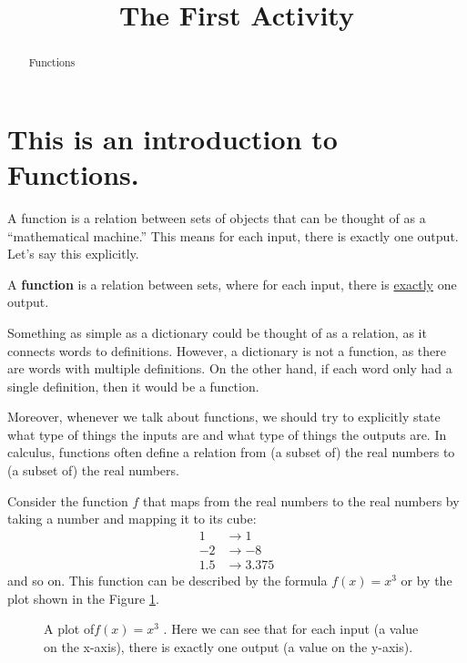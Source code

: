 \documentclass{ximera}
\title{The First Activity}
\theoremstyle{definition}
\begin{document}
  
\begin{abstract}  
Functions  
\end{abstract}  
\maketitle  
\section*{This is an introduction to Functions.}  
A function is a relation between sets of objects that can be thought of as a ``mathematical machine.'' This means for each input, there is exactly one output. Let’s say this explicitly.
\begin{definition}
	A \textbf{function} is a relation between sets, where for each input, there is \underline{exactly} one output.
\end{definition}
\begin{remark}
	Something as simple as a dictionary could be thought
	of as a relation, as it connects words to definitions.
	However, a dictionary is not a function, as there
	are words with multiple definitions. On the other
	hand, if each word only had a single definition, then
	it would be a function.
\end{remark}
Moreover, whenever we talk about functions, we should try to explicitly state what type of things the inputs are and what type of things the outputs are. In calculus, functions often define a relation from (a subset of) the real numbers to (a subset of) the real numbers.
\begin{example}
	Consider the function \(f\) that maps from the real numbers to
	the real numbers by taking a number and mapping it to its cube:
\begin{align*}
1&\to 1\\
-2&\to -8\\
1.5&\to 3.375
\end{align*}
and so on. This function can be described by the formula \(f(x)= x^3\) or by the plot shown in the Figure \ref{fig1}.
\end{example}
\begin{figure}
	\centering
	\caption{\small A plot of\(f(x)=x^3\) . Here we can see that
		for each input (a value on the x-axis), there is exactly one output (a value on the y-axis).}\label{fig1}
\end{figure}
\end{document}
